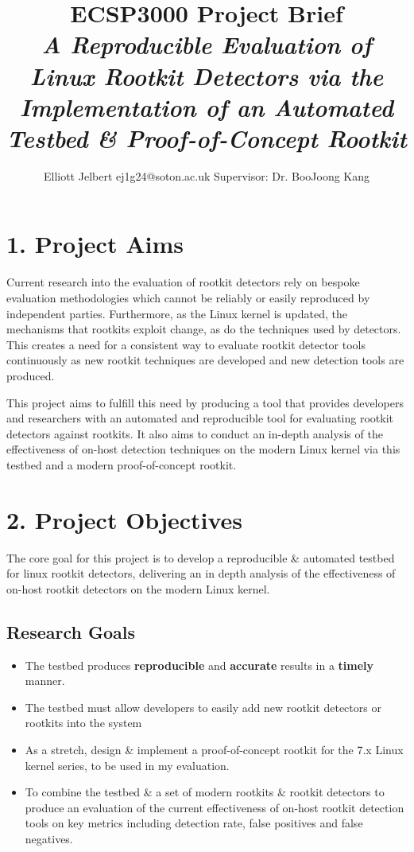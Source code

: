 \documentclass[12pt, a4paper]{article}
\title{\textbf{ECSP3000 Project Brief}\\[1em] \Large \textit{A Reproducible Evaluation of Linux Rootkit Detectors via the Implementation of an Automated Testbed \& Proof-of-Concept Rootkit}}
\author{Elliott Jelbert \qquad ej1g24@soton.ac.uk \qquad Supervisor: Dr. BooJoong Kang}
\date{}
\begin{document}
\maketitle
\section*{1. Project Aims}
Current research into the evaluation of rootkit detectors rely on bespoke evaluation methodologies which cannot be reliably or easily reproduced by independent parties. Furthermore, as the Linux kernel is updated, the mechanisms that rootkits exploit change, as do the techniques used by detectors. This creates a need for a consistent way to evaluate rootkit detector tools continuously as new rootkit techniques are developed and new detection tools are produced.

This project aims to fulfill this need by producing a tool that provides developers and researchers with an automated and reproducible tool for evaluating rootkit detectors against rootkits. It also aims to conduct an in-depth analysis of the effectiveness of on-host detection techniques on the modern Linux kernel via this testbed and a modern proof-of-concept rootkit.
\section*{2. Project Objectives}
The core goal for this project is to develop a reproducible \& automated testbed for linux rootkit detectors, delivering an in depth analysis of the effectiveness of on-host rootkit detectors on the modern Linux kernel.
\subsection*{Research Goals}
\begin{itemize}[noitemsep]
    \item The testbed produces \textbf{reproducible} and \textbf{accurate} results in a \textbf{timely} manner.
    \item The testbed must allow developers to easily add new rootkit detectors or rootkits into the system
    \item As a stretch, design \& implement a proof-of-concept rootkit for the 7.x Linux kernel series, to be used in my evaluation.
    \item To combine the testbed \& a set of modern rootkits \& rootkit detectors to produce an evaluation of the current effectiveness of on-host rootkit detection tools on key metrics including detection rate, false positives and false negatives. 
\end{itemize}
\end{document}
